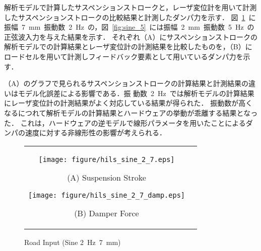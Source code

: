 \documentclass[a4paper,12pt]{article_vdlab_sotsuron}
\begin{document}
\newpage
解析モデルで計算したサスペンションストロークと，レーザ変位計を用いて計測したサスペンションストロークの比較結果と計測したダンパ力を示す．
図~\ref{fig:sine_2}~に振幅~7~mm~振動数~2~Hz~の，図~\ref{fig:sine_5}~には振幅~2~mm~振動数~5~Hz~の正弦波入力を与えた結果を示す．
それぞれ（A）にサスペンションストロークの解析モデルでの計算結果とレーザ変位計の計測結果を比較したものを，（B）にロードセルを用いて計測しフィードバック要素として用いているダンパ力を示す．
\par
（A）のグラフで見られるサスペンションストロークの計算結果と計測結果の違いはモデル化誤差による影響である．振
動数~2~Hz~では解析モデルの計算結果にレーザ変位計の計測結果がよく対応している結果が得られた．
振動数が高くなるにつれて解析モデルの計算結果とハードウェアの挙動が乖離する結果となった．
これは，ハードウェアの逆モデルで線形パラメータを用いたことによるダンパの速度に対する非線形性の影響が考えられる．
\vspace{10mm}
\begin{figure}[h]
    \begin{tabular}{cc}
      \begin{minipage}{0.45\hsize}
	\centering
	  \texttt{[image: figure/hils\_sine\_2\_7.eps]}
	  \begin{center}
	  \vspace{2mm}
	  \ (A) Suspension Stroke\
	  \end{center}
	\end{minipage}
       \begin{minipage}{0.45\hsize}
	\centering
	  \texttt{[image: figure/hils\_sine\_2\_7\_damp.eps]}
	  \begin{center}
	  \vspace{2mm}
	  \ (B) Damper Force\
	  \end{center}
      \end{minipage}
    \end{tabular}
    \vspace{2mm}
    \caption{Road Input (Sine 2~Hz~7~mm)}
    \label{fig:sine_2}
\end{figure}
\end{document}
